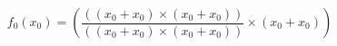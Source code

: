 \documentclass{article}
\begin{document}
\begin{equation}
f_0(x_0)=\left(\frac{\left(\left(x_0 + x_0\right) \times \left(x_0 + x_0\right)\right)}{\left(\left(x_0 + x_0\right) \times \left(x_0 + x_0\right)\right)} \times \left(x_0 + x_0\right)\right)
\end{equation}
\end{document}
